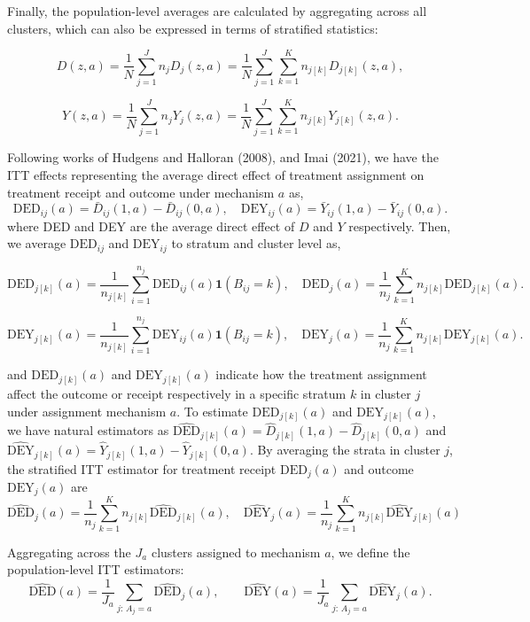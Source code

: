 \documentclass[a4paper, 12pt]{article}
\begin{document}
Finally, the population-level averages are calculated by aggregating across all clusters, which can also be expressed in terms of stratified statistics:

$$
D(z, a) = \frac{1}{N} \sum_{j=1}^{J} n_j D_j(z, a) = \frac{1}{N} \sum_{j=1}^{J} \sum_{k=1}^K n_{j[k]} D_{j[k]}(z, a),
$$

$$
Y(z, a) = \frac{1}{N} \sum_{j=1}^{J} n_j Y_j(z, a) = \frac{1}{N} \sum_{j=1}^{J} \sum_{k=1}^K n_{j[k]} Y_{j[k]}(z, a).
$$


Following works of Hudgens and Halloran (2008), and Imai (2021), we have the ITT effects representing the average direct effect of treatment assignment on treatment receipt and outcome under mechanism $a$ as,
$$
\mathrm{DED}_{ij}(a) = \bar{D}_{ij}(1, a) - \bar{D}_{ij}(0, a),
\quad
\mathrm{DEY}_{ij}(a) = \bar{Y}_{ij}(1, a) - \bar{Y}_{ij}(0, a).
$$
where DED and DEY are the average direct effect of $D$ and $Y$ respectively. Then, we average $\text{DED}_{ij}$ and $\text{DEY}_{ij}$ to stratum and cluster level as,

$$
\mathrm{DED}_{j[k]}(a) = \frac{1}{n_{j[k]}} \sum_{i=1}^{n_j} \mathrm{DED}_{ij}(a) \mathbf{1}(B_{ij} = k),
\quad
\mathrm{DED}_{j} (a) = \frac{1}{n_j} \sum_{k=1}^{K} n_{j[k]} \mathrm{DED}_{j[k]}(a).
$$

$$
\mathrm{DEY}_{j[k]}(a) = \frac{1}{n_{j[k]}} \sum_{i=1}^{n_j} \mathrm{DEY}_{ij}(a) \mathbf{1}(B_{ij} = k),
\quad
\mathrm{DEY}_{j} (a) = \frac{1}{n_j} \sum_{k=1}^{K} n_{j[k]} \mathrm{DEY}_{j[k]}(a).
$$

and $\mathrm{DED}_{j[k]}(a)$ and $\mathrm{DEY}_{j[k]}(a)$ indicate how the treatment assignment affect the outcome or receipt respectively in a specific stratum $k$ in cluster $j$ under assignment mechanism $a$.
To estimate $\text{DED}_{j[k]}(a)$ and $\text{DEY}_{j[k]}(a)$, we have natural estimators as $\widehat{\text{DED}}_{j[k]}(a) = \widehat{D}_{j[k]}(1, a) - \widehat{D}_{j[k]}(0,a)$ and $\widehat{\text{DEY}}_{j[k]}(a) = \widehat{Y}_{j[k]}(1, a) - \widehat{Y}_{j[k]}(0,a)$. By averaging the strata in cluster $j$, the stratified ITT estimator for treatment receipt $\text{DED}_{j}(a)$ and outcome $\text{DEY}_{j}(a)$ are
$$
\widehat{\text{DED}}_{j}(a) = \frac{1}{n_j} \sum_{k=1}^{K}n_{j[k]} \widehat{\text{DED}}_{j[k]}(a)
,\quad
\widehat{\text{DEY}}_{j}(a) = \frac{1}{n_j} \sum_{k=1}^{K}n_{j[k]} \widehat{\text{DEY}}_{j[k]}(a)
$$

Aggregating across the $J_a$ clusters assigned to mechanism $a$, we define the population-level ITT estimators:
$$
\widehat{\mathrm{DED}}(a) = \frac{1}{J_a}\sum_{j:\,A_j=a}\widehat{\mathrm{DED}}_j(a),
\qquad
\widehat{\mathrm{DEY}}(a) = \frac{1}{J_a}\sum_{j:\,A_j=a}\widehat{\mathrm{DEY}}_j(a).
$$
\end{document}
